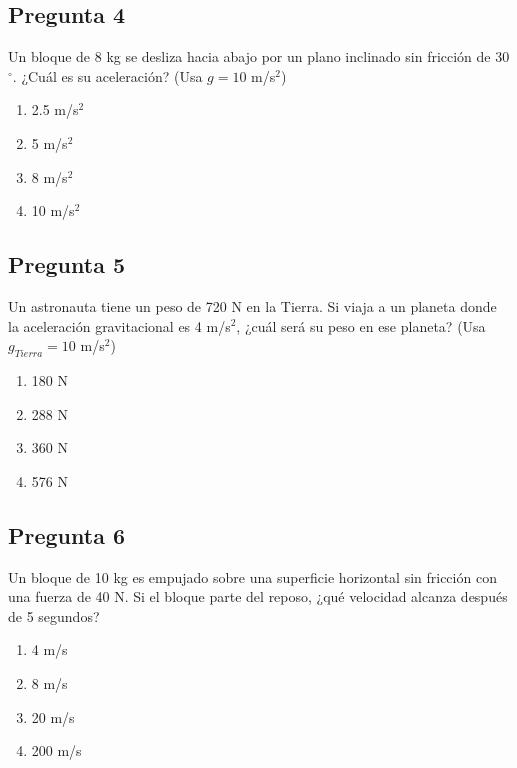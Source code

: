 \begin{preguntabox}
\subsection{Pregunta 4}
Un bloque de 8 kg se desliza hacia abajo por un plano inclinado sin fricción de 30$^\circ$. ¿Cuál es su aceleración? (Usa $g = 10$ m/s$^2$)

\begin{enumerate}
    \item[A)] 2.5 m/s$^2$
    \item[B)] 5 m/s$^2$
    \item[C)] 8 m/s$^2$
    \item[D)] 10 m/s$^2$
\end{enumerate}
\end{preguntabox}

\begin{preguntabox}
\subsection{Pregunta 5}
Un astronauta tiene un peso de 720 N en la Tierra. Si viaja a un planeta donde la aceleración gravitacional es 4 m/s$^2$, ¿cuál será su peso en ese planeta? (Usa $g_{Tierra} = 10$ m/s$^2$)

\begin{enumerate}
    \item[A)] 180 N
    \item[B)] 288 N
    \item[C)] 360 N
    \item[D)] 576 N
\end{enumerate}
\end{preguntabox}

\begin{preguntabox}
\subsection{Pregunta 6}
Un bloque de 10 kg es empujado sobre una superficie horizontal sin fricción con una fuerza de 40 N. Si el bloque parte del reposo, ¿qué velocidad alcanza después de 5 segundos?

\begin{enumerate}
    \item[A)] 4 m/s
    \item[B)] 8 m/s
    \item[C)] 20 m/s
    \item[D)] 200 m/s
\end{enumerate}
\end{preguntabox}

